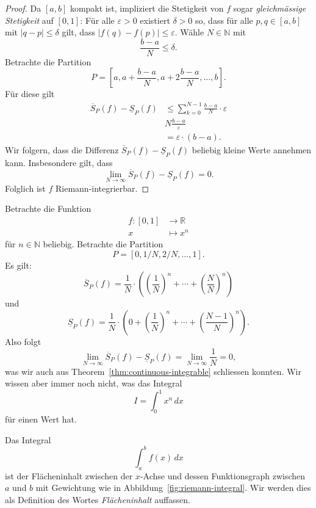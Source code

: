 \documentclass[../main.tex]{subfiles}
\begin{document}
\begin{proof}
  Da $[a, b]$ kompakt ist, impliziert die Stetigkeit von $f$ sogar
  \emph{gleichmässige Stetigkeit} auf $[0, 1]$:
  Für alle $\varepsilon > 0$ existiert $\delta > 0$ so, dass
  für alle $p, q \in [a, b]$ mit $|q - p| \leq \delta$ gilt, dass
  $|f(q) - f(p)| \leq \varepsilon$.
  Wähle $N \in \mathbb{N}$ mit
  \[
    \frac{b-a}{N} \leq \delta.
  \]
  Betrachte die Partition
   \[
    P = \left[ a, a + \frac{b - a}{N}, a + 2 \frac{b-a}{N}, \dots,
    b\right].
  \]
  Für diese gilt
  \begin{align*}
    \overline S_P(f) - \underline S_P(f)
    &\leq \sum_{k=0}^{N-1} \frac{b-a}{N}\cdot \varepsilon  \\
    & N \frac{b-a}{\varepsilon} \\
    &= \varepsilon \cdot (b-a).
  \end{align*}
  Wir folgern, dass die Differenz $\overline S_P(f) - \underline S_P(f)$ 
  beliebig kleine Werte annehmen kann. Insbesondere gilt,
  dass
  \[
    \lim_{N \to \infty} \overline S_P(f) - \underline S_P(f) = 0.
  \]
  Folglich ist $f$ Riemann-integrierbar.
\end{proof}

\begin{example}
  Betrachte die Funktion
  \begin{align*}
    f \colon [0, 1] & \to \mathbb{R} \\
    x & \mapsto x^n
  \end{align*}
  für $n \in \mathbb{N}$ beliebig. Betrachte die
  Partition
  \[
    P = [0, 1/N, 2/N, \dots, 1].
  \]
  Es gilt:
  \[
    \overline S_P(f) = \frac{1}{N} \cdot \left( {\left( \frac{1}{N}  \right)}^n
    + \cdots + {\left( \frac{N}{N}  \right)}^n \right)
  \]
  und
  \[
    \underline S_P(f) = \frac{1}{N} \cdot \left( 0 +{\left( \frac{1}{N}  \right)}^n 
    + \cdots + {\left( \frac{N-1}{N}  \right)}^n\right).
  \]
  Also folgt
  \[
    \lim_{N \to \infty} \overline S_P(f) - \underline S_P(f) = 
    \lim_{N \to \infty}\frac{1}{N} = 0,
  \]
  was wir auch aus Theorem~\ref{thm:continuous-integrable} schliessen konnten.
  Wir wissen aber immer noch nicht, was das Integral
  \[
    I = \int_{0}^{1} x^n \, dx
  \]
  für einen Wert hat.
\end{example}

\begin{geometric}
  Das Integral
  \[
    \int_{a}^{b} f(x) \, dx
  \]
  ist der Flächeninhalt zwischen der $x$-Achse und dessen
  Funktionsgraph zwischen $a$ und $b$ mit Gewichtung
  wie in Abbildung~\ref{fig:riemann-integral}.
  Wir werden dies als Definition des Wortes
  \textit{Flächeninhalt} auffassen.
\end{geometric}
\end{document}

